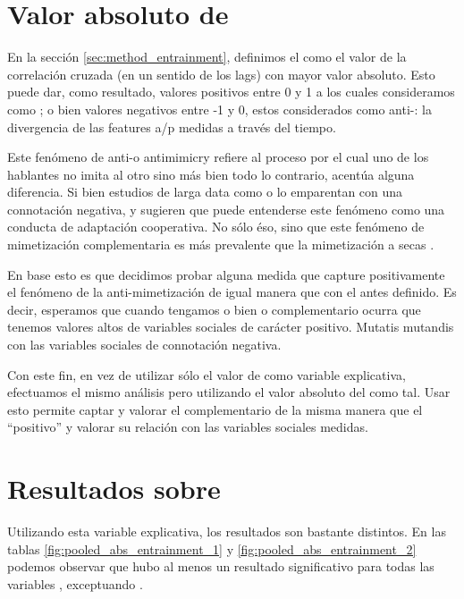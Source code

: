 

\section{Valor absoluto de \entrainment}

En la sección \ref{sec:method_entrainment}, definimos el \entrainment como el valor de la correlación cruzada (en un sentido de los lags) con mayor valor absoluto. Esto puede dar, como resultado, valores positivos entre 0 y 1 a los cuales consideramos como \entrainment; o bien valores negativos entre -1 y 0, estos considerados como anti-\entrainment: la divergencia de las features a/p medidas a través del tiempo.

Este fenómeno de anti-\entrainment o antimimicry \cite{CHAR1999} refiere al proceso por el cual uno de los hablantes no imita al otro sino más bien todo lo contrario, acentúa alguna diferencia. Si bien estudios de larga data como \cite{bourhis1973language} o \cite{dabbs1969similarity} lo emparentan con una connotación negativa, \cite{healey2014divergence} y \cite{levitan2015acoustic} sugieren que puede entenderse este fenómeno como una conducta de adaptación cooperativa. No sólo éso, sino que este fenómeno de mimetización complementaria es más prevalente que la mimetización a secas \cite{levitan2015acoustic}.

En base esto es que decidimos probar alguna medida que capture positivamente el fenómeno de la anti-mimetización de igual manera que con el \entrainment antes definido. Es decir, esperamos que cuando tengamos o bien \entrainment o \entrainment complementario ocurra que tenemos valores altos de variables sociales de carácter positivo. Mutatis mutandis con las variables sociales de connotación negativa.

Con este fin, en vez de utilizar sólo el valor de \entrainment como variable explicativa, efectuamos el mismo análisis pero utilizando el valor absoluto del \entrainment como tal. Usar esto permite captar y valorar el \entrainment complementario de la misma manera que el ``positivo'' y valorar su relación con las variables sociales medidas.

\section{Resultados sobre \absentrainment}

Utilizando esta variable explicativa, los resultados son bastante distintos. En las tablas \ref{fig:pooled_abs_entrainment_1} y \ref{fig:pooled_abs_entrainment_2} podemos observar que hubo al menos un resultado significativo para todas las variables \ap, exceptuando \PHONAVG. 

